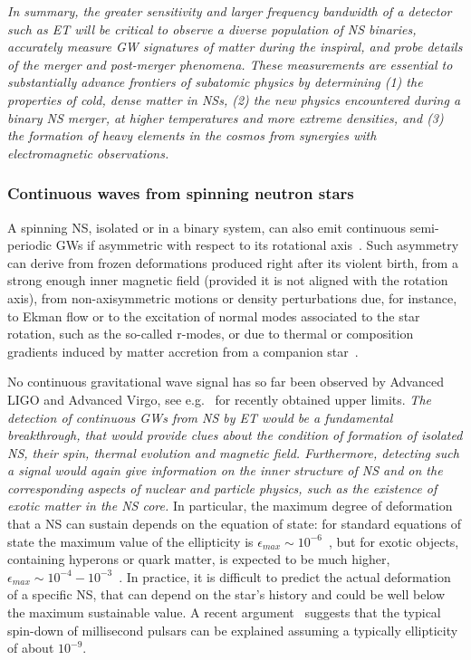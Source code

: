 {\em In summary, the greater sensitivity and larger frequency bandwidth of a detector such as ET will be critical to observe a diverse population of NS binaries, accurately measure GW signatures of matter during the inspiral, and probe details of the merger and post-merger phenomena. These measurements are essential to substantially advance frontiers of subatomic physics by determining (1) the properties of cold, dense matter in NSs, (2) the new physics encountered during a binary NS merger, at higher temperatures and more extreme densities, and (3) the formation of heavy elements in the cosmos from synergies with electromagnetic observations.}




\subsubsection{Continuous waves from spinning neutron stars}

A spinning NS, isolated or in a binary system, can also emit continuous semi-periodic GWs if asymmetric with respect to its rotational axis~\cite{Maggiore:2018zz}. 
Such asymmetry can derive from frozen deformations produced right after its violent birth, from a strong enough inner magnetic field (provided it is not aligned with the rotation axis), from non-axisymmetric motions or density perturbations due, for instance, to Ekman flow or to the excitation of normal modes associated to the star rotation, such as the so-called r-modes, or due to thermal or composition gradients induced by matter accretion from a companion star~\cite{Lasky:2015uia}. 

No continuous gravitational wave signal has so far been observed  by Advanced LIGO and Advanced Virgo, see e.g.~\cite{Authors:2019ztc,Abbott:2019bed,Pisarski:2019vxw,Abbott:2018qee,2019arXiv191005097P,Abbott:2019uwg} for recently obtained upper limits.
{\em The detection of continuous GWs from NS by ET would be a fundamental breakthrough, that would provide  clues about  the condition of formation of isolated NS,  their spin, thermal evolution and magnetic field. Furthermore,  detecting such a signal would again give information on the inner structure of NS and on the corresponding aspects of nuclear and particle physics, such as the existence of exotic matter in the NS core.} In particular,
the maximum degree of deformation that a NS can sustain depends on the equation of state: for standard equations of state the maximum value of the ellipticity is $\epsilon_{max} \sim 10^{-6}$~\cite{Horowitz:2009ya}, but for exotic objects, containing hyperons or quark matter, is expected to be much higher, $\epsilon_{max}\sim 10^{-4}-10^{-3}$~\cite{JohnsonMcDaniel:2012wg}. In practice, it is difficult to predict the actual deformation of  a specific NS, that can depend on the star's history and could be well below the maximum sustainable value. A recent argument~\cite{Woan:2018xxx} suggests that the typical spin-down of millisecond pulsars can be explained assuming a typically ellipticity of about $10^{-9}$. 

